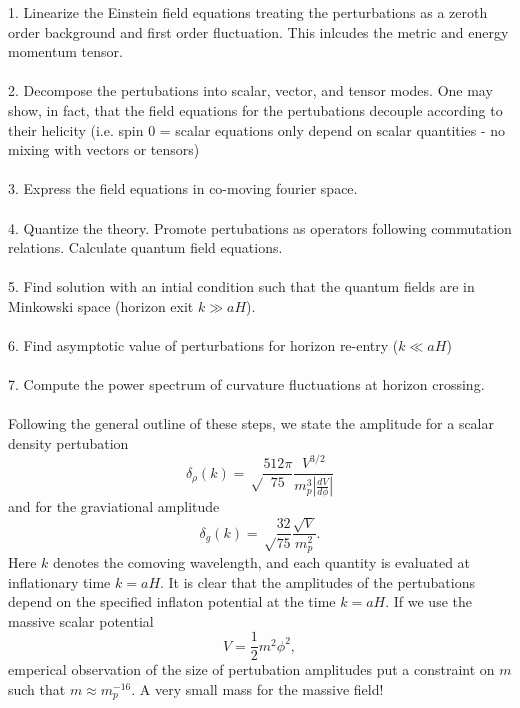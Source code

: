 \documentclass[10pt,letterpaper]{article}
\begin{document}
1. Linearize the Einstein field equations treating the perturbations as a zeroth order background and first order fluctuation. This inlcudes the metric and energy momentum tensor.\\ \\
2. Decompose the pertubations into scalar, vector, and tensor modes. One may show, in fact, that the field equations for the pertubations decouple according to their helicity (i.e. spin 0 = scalar equations only depend on scalar quantities - no mixing with vectors or tensors)\\ \\
3. Express the field equations in co-moving fourier space.\\ \\
4. Quantize the theory. Promote pertubations as operators following commutation relations. Calculate quantum field equations.\\ \\
5. Find solution with an intial condition such that the quantum fields are in Minkowski space (horizon exit $k\gg aH$).\\ \\
6. Find asymptotic value of perturbations for horizon re-entry  ($k \ll aH$)\\ \\
7. Compute the power spectrum of curvature fluctuations at horizon crossing.\\ \\
Following the general outline of these steps, we state the amplitude for a scalar density pertubation
\[
	\delta_\rho(k) = \sqrt\frac{512\pi}{75}\frac{V^{3/2}}{m_p^3|\frac{dV}{d\phi}|}
\]
and for the graviational amplitude
\[
	\delta_g(k) = \sqrt\frac{32}{75}\frac{\sqrt V}{m_p^2}.
\]
Here $k$ denotes the comoving wavelength, and each quantity is evaluated at inflationary time $k = aH$. It is clear that the amplitudes of the pertubations depend on the specified inflaton potential at the time $k=aH$. If we use the massive scalar potential
\[
	V = \frac12 m^2\phi^2,
\]
emperical observation of the size of pertubation amplitudes put a constraint on $m$ such that $m\approx m_p^{-16}$. A very small mass for the massive field!
\end{document}
